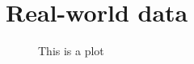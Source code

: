 \chapter{Real-world data}\label{real_data}

\begin{figure}[h]
    \centering
    \resizebox{1.0\textwidth}{!}{}
    \caption{This is a plot}
\end{figure}
